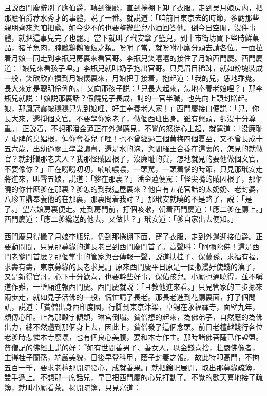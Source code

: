 且説西門慶辭別了應伯爵，轉到後廳，直到捲棚下卸了衣服。走到吴月娘房内，把那應伯爵荐水秀才的事體，説了一番。就説道：「咱前日東京去的時節，多虧那些親朋齊來與咱把盞。如今少不的也要整辦些兒小酒回答他。倒今日空閒，沒件事體，就把這事兒完了也罷。」當下就叫了玳安拿了籃兒，到十市街坊買下些時鮮菓品，猪羊魚肉，腌臘鷄鵝嗄飯之類。吩咐了當，就吩咐小廝分頭去請各位。一面拉着月娘一同走到李瓶兒房裏來看官哥。李瓶兒笑嘻嘻的接住了月娘西門慶。西門慶道：「娘兒來看孩子哩。」李瓶兒就叫奶子抱出官哥。只見眉目稀疎，就如粉塊裝成一般，笑欣欣直攢到月娘懷裏來，月娘把手接着，抱起道：「我的兒，恁地乖覺。長大來定是聰明伶俐的。」又向那孩子説：「兒長大起來，怎地奉養老娘哩？」那李瓶兒就説：「娘説那裏話？假饒兒子長成，討的一官半職，也先向上頭封贈起。娘，那鳳冠霞帔穩穩兒先到娘哩，好生奉養老人家！」西門慶接口便説：「兒，你長大來，還掙個文官。不要學你家老子，做個西班出身。雖有興頭，卻沒十分尊重。」正説着，不想那潘金蓮正在外邊聽見，不覺的怒従心上起，就駡道：「没廉耻弄虚脾的臭娼根，偏你會養兒子哩！也不曾經過三個黄梅四個夏至，又不曾長成十五六歲，出幼過關上學堂讀書，還是水的泡，與閻羅王合養在這裏的，怎見的就做官？就封贈那老夫人？我那怪賊囚根子，沒廉耻的貨，怎地就見的要他做個文官，不要像你？」正在嘮嘮叨叨，喃喃噥噥，一頭駡，一頭着惱的時節，只見那玳安走將進來，叫聲五娘，説道：「爹在那裏？」潘金蓮便駡：「怪尖嘴的賊囚根子，那個曉的你什麽爹在那裏？爹怎的到我這屋裏來？他自有五花官誥的太奶奶、老封婆，八珍五鼎奉養他的在那裏，那裏問着我討？」那玳安就曉的不是路了，説：「是了。」望六娘房裏便走。走到房門前，打個咳嗽，朝着西門慶道：「應二爹在廳上。」西門慶道：「應二爹纔送的他去，又做甚？」玳安道：「爹自家出去便知。」

西門慶只得撇了月娘李瓶兒，仍到那捲棚下面，穿了衣服，走到外邊迎接伯爵。正要動問間，只見那募緣的道長老已到西門慶門首了。高聲呌：「阿彌陀佛！這是西門老爹門首麽？那個掌事的管家與吾傳報一聲，説道扶桂子、保蘭孫，求福有福，求壽有壽，東京募緣的長老求見。」原來西門慶平日原是一個撒漫好使錢的漢子，又是新得官哥，心下十分歡喜，也要幹些好事，保佑孩兒。小廝也通曉得，並不嗔道作難，一壁廂進報西門慶。西門慶就説：「且教他進來看。」只見管家的三步挪來兩步走，就如見子活佛的一般，慌忙請了長老。那長老進到花廳裏面，打了個問訊，説道：「貧僧出身西印度國，行脚到東京汴梁，卓錫在永福禪寺，面壁九年，頗傳心印。止為那殿宇傾頽，琳宫倒塌。貧僧想的起來，為佛弟子，自然應的為佛出力，總不然趲到那個身上去，因此上，貧僧發了這個念頭。前日老檀越餞行各位老爹時悲憐本寺廢壞，也有個良心美腹，要和本寺作主。那時諸佛菩薩已作證盟。貧僧記的佛經上説的好：『如有世間善男子、善女人，以金錢喜捨，莊嚴佛像者，主得桂子蘭孫，端嚴美貌，日後早登科甲，蔭子封妻之報。』故此特叩高門，不拘五百一千，要求老檀那開疏發心，成就善果。」就把錦帊展開，取出那募緣疏簿，雙手遞上。不想那一席話兒，早已把西門慶的心兒打動了。不覺的歡天喜地接了疏簿，就叫小廝看茶。揭開疏簿，只見寫道：

